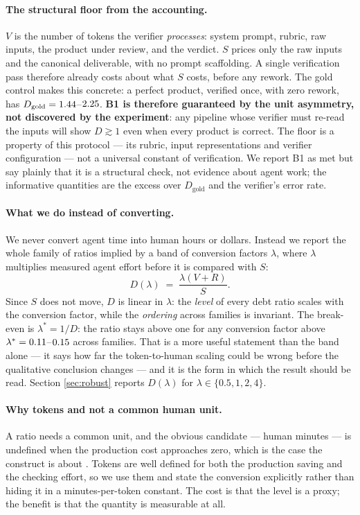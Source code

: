 \documentclass[11pt]{article}
\newcommand{\D}{\ensuremath{D}}
\newcommand{\SV}{\ensuremath{S}}
\newcommand{\VV}{\ensuremath{V}}
\newcommand{\RV}{\ensuremath{R}}
\begin{document}
\paragraph{The structural floor from the accounting.} $\VV$ is the number of tokens the verifier
\emph{processes}: system prompt, rubric, raw inputs, the product under review, and the verdict. $\SV$
prices only the raw inputs and the canonical deliverable, with no prompt scaffolding. A single
verification pass therefore already costs about what $\SV$ costs, before any rework. The gold
control makes this concrete: a perfect product, verified once, with zero rework, has
$\D_{\text{gold}}=\VDgoldDmin$--$2.25$. \textbf{B1 is therefore guaranteed by the unit asymmetry,
not discovered by the experiment}: any pipeline whose verifier must re-read the inputs will show
$\D\gtrsim 1$ even when every product is correct. The floor is a property of this protocol
--- its rubric, input representations and verifier configuration --- not a universal constant
of verification. We report B1 as met but say plainly that it is a
structural check, not evidence about agent work; the informative quantities are the excess over
$\D_{\text{gold}}$ and the verifier's error rate.

\paragraph{What we do instead of converting.} We never convert agent time into human hours or
dollars. Instead we report the whole family of ratios implied by a band of conversion factors
$\lambda$, where $\lambda$ multiplies measured agent effort before it is compared with $\SV$:
\begin{equation}
\D(\lambda) \;=\; \frac{\lambda(\VV+\RV)}{\SV}.
\label{eq:lambda}
\end{equation}
Since $\SV$ does not move, $\D$ is linear in $\lambda$: the \emph{level} of every debt ratio scales
with the conversion factor, while the \emph{ordering} across families is invariant. The break-even
is $\lambda^{*}=1/\D$: the ratio stays above one for any conversion factor above
$\lambda^{*}=0.11$--$0.15$ across families. That is a more useful statement
than the band alone --- it says how far the token-to-human scaling could be wrong before the
qualitative conclusion changes --- and it is the form in which the result should be read. Section
\ref{sec:robust} reports $\D(\lambda)$ for $\lambda\in\{0.5,1,2,4\}$.

\paragraph{Why tokens and not a common human unit.} A ratio needs a common unit, and the obvious
candidate --- human minutes --- is undefined when the production cost approaches zero, which is the
case the construct is about \citep{crescitelli2026}. Tokens are well defined for both the
production saving and the checking effort, so we use them and state the conversion explicitly
rather than hiding it in a minutes-per-token constant. The cost is that the level is a proxy; the
benefit is that the quantity is measurable at all.
\end{document}
